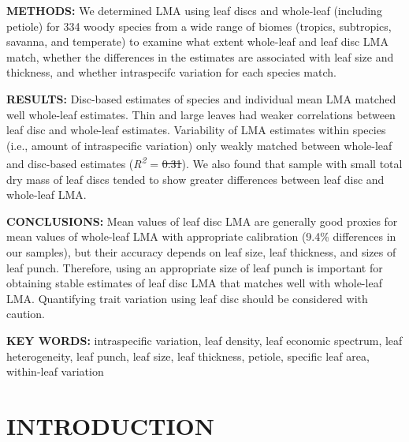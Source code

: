\documentclass[
  12pt,
  a4paper,
,tablecaptionabove
]{scrartcl}
\providecommand{\DIFaddtex}[1]{{\protect\color{blue}\uwave{#1}}} %
\providecommand{\DIFdeltex}[1]{{\protect\color{red}\sout{#1}}}                      %
\providecommand{\DIFaddbegin}{} %
\providecommand{\DIFaddend}{} %
\providecommand{\DIFdelbegin}{} %
\providecommand{\DIFdelend}{} %
\providecommand{\DIFadd}[1]{\texorpdfstring{\DIFaddtex{#1}}{#1}} %
\providecommand{\DIFdel}[1]{\texorpdfstring{\DIFdeltex{#1}}{}} %
\newcommand{\DIFscaledelfig}{0.5}
\newlength{\DIFdelgraphicswidth} %
\newlength{\DIFdelgraphicsheight} %
\newcommand{\DIFaddincludegraphics}[2][]{{\color{blue}\fbox{\DIFOincludegraphics[#1]{#2}}}} %
\newcommand{\DIFdelincludegraphics}[2][]{%
\sbox{\DIFdelgraphicsbox}{\DIFOincludegraphics[#1]{#2}}%
\settoboxwidth{\DIFdelgraphicswidth}{\DIFdelgraphicsbox} %
\settoboxtotalheight{\DIFdelgraphicsheight}{\DIFdelgraphicsbox} %
\scalebox{\DIFscaledelfig}{%
\parbox[b]{\DIFdelgraphicswidth}{\usebox{\DIFdelgraphicsbox}\\[-\baselineskip] \rule{\DIFdelgraphicswidth}{0em}}\llap{\resizebox{\DIFdelgraphicswidth}{\DIFdelgraphicsheight}{%
\setlength{\unitlength}{\DIFdelgraphicswidth}%
\begin{picture}(1,1)%
\thicklines\linethickness{2pt} %
{\color[rgb]{1,0,0}\put(0,0){\framebox(1,1){}}}%
{\color[rgb]{1,0,0}\put(0,0){\line( 1,1){1}}}%
{\color[rgb]{1,0,0}\put(0,1){\line(1,-1){1}}}%
\end{picture}%
}\hspace*{3pt}}} %
} %
\DeclareRobustCommand{\DIFaddbegin}{\DIFOaddbegin \let\includegraphics\DIFaddincludegraphics} %
\DeclareRobustCommand{\DIFaddend}{\DIFOaddend \let\includegraphics\DIFOincludegraphics} %
\DeclareRobustCommand{\DIFdelbegin}{\DIFOdelbegin \let\includegraphics\DIFdelincludegraphics} %
\DeclareRobustCommand{\DIFdelend}{\DIFOaddend \let\includegraphics\DIFOincludegraphics} %
\begin{document}
\textbf{METHODS:}
We determined LMA using leaf discs and whole-leaf (including petiole) for 334 woody species from a wide range of biomes (tropics, subtropics, savanna, and temperate) to examine what extent whole-leaf and leaf disc LMA match, whether the differences in the estimates are associated with leaf size and thickness, and whether intraspecifc variation for each species match.

\textbf{RESULTS:}
Disc-based estimates of species and individual mean LMA matched well whole-leaf estimates.
Thin and large leaves had weaker correlations between leaf disc and whole-leaf estimates.
Variability of LMA estimates within species (i.e., amount of intraspecific variation) only weakly matched between whole-leaf and disc-based estimates (\emph{R\textsuperscript{2}} = \DIFdelbegin \DIFdel{0.31}\DIFdelend \DIFaddbegin \DIFadd{0.09}\DIFaddend ).
We also found that sample with small total dry mass of leaf discs tended to show greater differences between leaf disc and whole-leaf LMA.

\textbf{CONCLUSIONS:}
Mean values of leaf disc LMA are generally good proxies for mean values of whole-leaf LMA with appropriate calibration (9.4\% differences in our samples), but their accuracy depends on leaf size, leaf thickness, and sizes of leaf punch.
Therefore, using an appropriate size of leaf punch is important for obtaining stable estimates of leaf disc LMA that matches well with whole-leaf LMA.
Quantifying trait variation using leaf disc should be considered with caution.

\textbf{KEY WORDS:}
intraspecific variation,
leaf density,
leaf economic spectrum,
leaf heterogeneity,
leaf punch,
leaf size,
leaf thickness,
petiole,
specific leaf area,
within-leaf variation

\hypertarget{introduction}{%
\section{INTRODUCTION}\label{introduction}}
\end{document}
